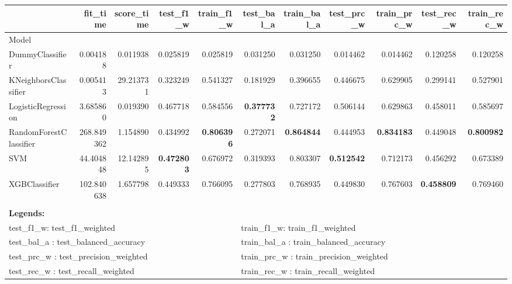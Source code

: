 \begin{tabular}{lrrrrrrrrrr}
\toprule
& fit\_time & score\_time & test\_f1\_w & train\_f1\_w & test\_bal\_a & train\_bal\_a & test\_prc\_w & train\_prc\_w & test\_rec\_w & train\_rec\_w \\ 
 \midrule
Model &  &  &  &  &  &  &  &  &  &  \\
DummyClassifier & 0.004188 & 0.011938 & 0.025819 & 0.025819 & 0.031250 & 0.031250 & 0.014462 & 0.014462 & 0.120258 & 0.120258 \\
KNeighborsClassifier & 0.005413 & 29.213731 & 0.323249 & 0.541327 & 0.181929 & 0.396655 & 0.446675 & 0.629905 & 0.299141 & 0.527901 \\
\rowcolor{lightgray} LogisticRegression & 3.685860 & 0.019390 & 0.467718 & 0.584556 & \textbf{0.377732} & 0.727172 & 0.506144 & 0.629863 & 0.458011 & 0.585697 \\
RandomForestClassifier & 268.849362 & 1.154890 & 0.434992 & \textbf{0.806396} & 0.272071 & \textbf{0.864844} & 0.444953 & \textbf{0.834183} & 0.449048 & \textbf{0.800982} \\
SVM & 44.404848 & 12.142895 & \textbf{0.472803} & 0.676972 & 0.319393 & 0.803307 & \textbf{0.512542} & 0.712173 & 0.456292 & 0.673389 \\
XGBClassifier & 102.840638 & 1.657798 & 0.449333 & 0.766095 & 0.277803 & 0.768935 & 0.449830 & 0.767603 & \textbf{0.458809} & 0.769460 \\
\bottomrule
{} \\
\multicolumn{10}{l}{\textbf{Legends:}}   \\ \midrule
\multicolumn{5}{l}{test\_f1\_w: test\_f1\_weighted} & \multicolumn{5}{l}{train\_f1\_w: train\_f1\_weighted} \\
\multicolumn{5}{l}{test\_bal\_a : test\_balanced\_accuracy } & \multicolumn{5}{l}{train\_bal\_a : train\_balanced\_accuracy } \\
\multicolumn{5}{l}{test\_prc\_w : test\_precision\_weighted } & \multicolumn{5}{l}{train\_prc\_w : train\_precision\_weighted } \\
\multicolumn{5}{l}{test\_rec\_w : test\_recall\_weighted} & \multicolumn{5}{l}{train\_rec\_w : train\_recall\_weighted} \\
\end{tabular}
